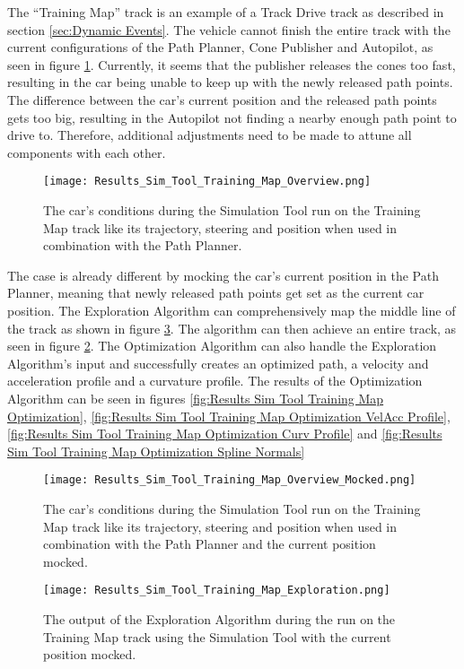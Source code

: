 The ``Training Map'' track is an example of a Track Drive track as described in section \ref{sec:Dynamic Events}. The vehicle cannot finish the entire track with the current configurations of the Path Planner, Cone Publisher and Autopilot, as seen in figure \ref{fig:Results Sim Tool Training Map Overview}. Currently, it seems that the publisher releases the cones too fast, resulting in the car being unable to keep up with the newly released path points. The difference between the car's current position and the released path points gets too big, resulting in the Autopilot not finding a nearby enough path point to drive to. Therefore, additional adjustments need to be made to attune all components with each other.
\begin{figure}[H]
    \centering
    \texttt{[image: Results\_Sim\_Tool\_Training\_Map\_Overview.png]}
    \caption{The car's conditions during the Simulation Tool run on the Training Map track like its trajectory, steering and position when used in combination with the Path Planner.}
    \label{fig:Results Sim Tool Training Map Overview}
\end{figure}

The case is already different by mocking the car's current position in the Path Planner, meaning that newly released path points get set as the current car position. The Exploration Algorithm can comprehensively map the middle line of the track as shown in figure \ref{fig:Results Sim Tool Training Map Exploration}. The algorithm can then achieve an entire track, as seen in figure \ref{fig:Results Sim Tool Training Map Overview Mocked}. The Optimization Algorithm can also handle the Exploration Algorithm's input and successfully creates an optimized path, a velocity and acceleration profile and a curvature profile. The results of the Optimization Algorithm can be seen in figures \ref{fig:Results Sim Tool Training Map Optimization}, \ref{fig:Results Sim Tool Training Map Optimization VelAcc Profile}, \ref{fig:Results Sim Tool Training Map Optimization Curv Profile} and \ref{fig:Results Sim Tool Training Map Optimization Spline Normals}
\begin{figure}[H]
    \centering
    \texttt{[image: Results\_Sim\_Tool\_Training\_Map\_Overview\_Mocked.png]}
    \caption{The car's conditions during the Simulation Tool run on the Training Map track like its trajectory, steering and position when used in combination with the Path Planner and the current position mocked.}
    \label{fig:Results Sim Tool Training Map Overview Mocked}
\end{figure}
\begin{figure}[H]
    \centering
    \texttt{[image: Results\_Sim\_Tool\_Training\_Map\_Exploration.png]}
    \caption{The output of the Exploration Algorithm during the run on the Training Map track using the Simulation Tool with the current position mocked.}
    \label{fig:Results Sim Tool Training Map Exploration}
\end{figure}

